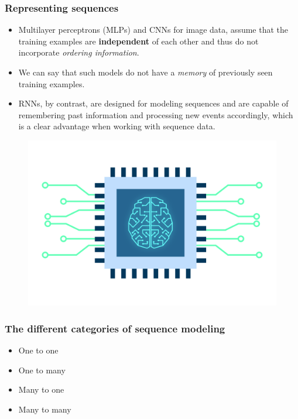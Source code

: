 \documentclass[11pt,]{beamer}
\begin{document}
\begin{frame}
    \frametitle{Representing sequences}
    \begin{itemize}
        \item Multilayer perceptrons (MLPs) and CNNs for image data, assume that the training examples are \textbf{independent} of each other and thus do not incorporate \textit{ordering information}. 

        \item We can say that such models do not have a \textit{memory} of previously seen training examples.
        \item RNNs, by contrast, are designed for modeling sequences and are capable of remembering past information and processing new events accordingly, which is a clear advantage when working with sequence data.
    \end{itemize}
    \begin{figure}
        \centering
        \includegraphics[scale=0.2]{Images/9895013.png}
    \end{figure}
\end{frame}
\begin{frame}
    \frametitle{The different categories of sequence modeling}
    \begin{itemize}
        \item One to one
        \item One to many
        \item Many to one
        \item Many to many
    \end{itemize}
\end{frame}
\end{document}
